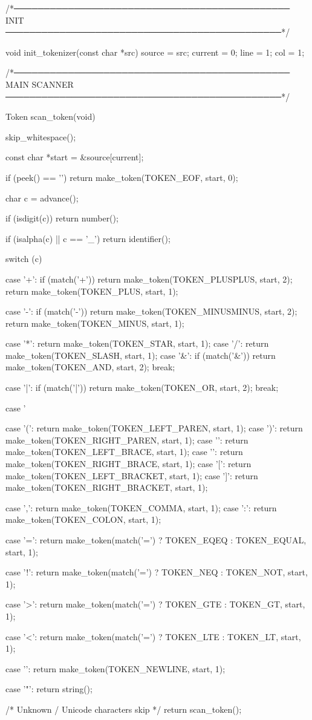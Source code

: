 \documentclass{article}
\begin{document}
/*──────────────────────────────────────────────
  INIT
──────────────────────────────────────────────*/

void init_tokenizer(const char *src)
{
    source  = src;
    current = 0;
    line    = 1;
    col     = 1;
}

/*──────────────────────────────────────────────
  MAIN SCANNER
──────────────────────────────────────────────*/

Token scan_token(void)
{
    skip_whitespace();

    const char *start = &source[current];

    if (peek() == '\0')
        return make_token(TOKEN_EOF, start, 0);

    char c = advance();

    if (isdigit(c))
        return number();

    if (isalpha(c) || c == '_')
        return identifier();

    switch (c) {

        case '+':
         if (match('+')) return make_token(TOKEN_PLUSPLUS, start, 2);
                   return make_token(TOKEN_PLUS, start, 1);

        case '-':
         if (match('-')) return make_token(TOKEN_MINUSMINUS, start, 2);
                   return make_token(TOKEN_MINUS, start, 1);

        case '*': return make_token(TOKEN_STAR, start, 1);
        case '/': return make_token(TOKEN_SLASH, start, 1);
        case '&':
    if (match('&')) return make_token(TOKEN_AND, start, 2);
             break;

        case '|':
    if (match('|')) return make_token(TOKEN_OR, start, 2);
             break;

        case '%

        case '(': return make_token(TOKEN_LEFT_PAREN, start, 1);
        case ')': return make_token(TOKEN_RIGHT_PAREN, start, 1);
        case '{': return make_token(TOKEN_LEFT_BRACE, start, 1);
        case '}': return make_token(TOKEN_RIGHT_BRACE, start, 1);
        case '[': return make_token(TOKEN_LEFT_BRACKET, start, 1);
        case ']': return make_token(TOKEN_RIGHT_BRACKET, start, 1);

        case ',': return make_token(TOKEN_COMMA, start, 1);
        case ':': return make_token(TOKEN_COLON, start, 1);

        case '=':
            return make_token(match('=') ? TOKEN_EQEQ : TOKEN_EQUAL, start, 1);

        case '!':
            return make_token(match('=') ? TOKEN_NEQ : TOKEN_NOT, start, 1);

        case '>':
            return make_token(match('=') ? TOKEN_GTE : TOKEN_GT, start, 1);

        case '<':
            return make_token(match('=') ? TOKEN_LTE : TOKEN_LT, start, 1);

        case '\n':
            return make_token(TOKEN_NEWLINE, start, 1);

        case '"':
            return string();
    }

    /* Unknown / Unicode characters skip */
    return scan_token();
}
\end{document}
